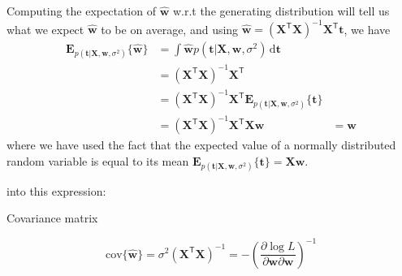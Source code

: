 \documentclass[a4paper,11pt]{article} %
\begin{document}
Computing the expectation of $\hat{\mathbf{w}}$ w.r.t the generating distribution will tell us
what we expect $\hat{\mathbf{w}}$ to be on average, and using
$\hat{\mathbf{w}} = (\mathbf{X}^{\mathsf{T}}\mathbf{X})^{-1}\mathbf{X}^{\mathsf{T}}\mathbf{t}$,
we have
\begin{align*}
\mathbf{E}_{p(\mathbf{t}|\mathbf{X},\mathbf{w},\sigma^2)}\{\hat{\mathbf{w}}\} & =
\int \hat{\mathbf{w}} p(\mathbf{t}|\mathbf{X},\mathbf{w},\sigma^2)\,\mathrm{d}\mathbf{t} \\
& = (\mathbf{X}^{\mathsf{T}}\mathbf{X})^{-1}\mathbf{X}^{\mathsf{T}} \\
& = (\mathbf{X}^{\mathsf{T}}\mathbf{X})^{-1}\mathbf{X}^{\mathsf{T}} 
\mathbf{E}_{p(\mathbf{t}|\mathbf{X},\mathbf{w},\sigma^2)}\{\mathbf{t}\} \\
& = (\mathbf{X}^{\mathsf{T}}\mathbf{X})^{-1}\mathbf{X}^{\mathsf{T}}\mathbf{X}\mathbf{w}
& = \mathbf{w}
\end{align*}
where we have used the fact that the expected value of a normally distributed random
variable is equal to its mean
$\mathbf{E}_{p(\mathbf{t}|\mathbf{X},\mathbf{w},\sigma^2)}\{\mathbf{t}\} =
\mathbf{X}\mathbf{w}$.


into this expression:


Covariance matrix

\begin{equation}
\mathrm{cov}\{\hat{\mathbf{w}}\} = \sigma^2 (\mathbf{X}^{\mathsf{T}}\mathbf{X})^{-1} =
-\left( \frac{\partial\log L}{\partial\mathbf{w}\partial\mathbf{w}} \right)^{-1}
\end{equation}




\end{document}
